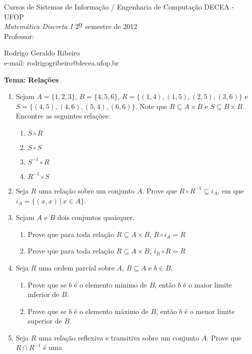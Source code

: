 \documentclass[11pt,a4paper]{report}
\begin{document}
 
\noindent Cursos de Sistemas de Informa\c{c}\~ao / Engenharia de Computa\c{c}\~ao
 \hfill DECEA - UFOP \\
{\it Matem\'atica Discreta I}
 \hfill $\mbox{2}^{\mbox{\underline{o}}}$ semestre de 2012 \\
Professor: \parbox[t]{14cm}{Rodrigo Geraldo Ribeiro \\
                     e-mail: rodrigogribeiro@decea.ufop.br}
 
 \hfill {\bf Tema: Rela\c{c}\~oes}
 
\vspace*{3mm}
\begin{enumerate}
	\item Sejam $A=\{1,2,3\}$, $B=\{4,5,6\}$, $R=\{(1,4), (1,5), (2,5), (3,6)\}$ e $S=\{(4,5), (4,6), (5,4), (6,6)\}$.
	      Note que $R\subseteq A\times B$ e $S\subseteq B\times B$. Encontre as seguintes rela\c{c}\~oes:
	\begin{enumerate}
		\item $S\circ R$
		\item $S\circ S$
		\item $S^{-1}\circ R$
		\item $R^{-1}\circ S$
	\end{enumerate}
	\item Seja $R$ uma rela\c{c}\~ao sobre um conjunto $A$. Prove que
          $R\circ R^{-1}\subseteq i_{A}$, em que $i_{A}=\{(x,x)\,|\,x\in A\}$.
	\item Sejam $A$ e $B$ dois conjuntos quaisquer.
	\begin{enumerate}
		\item Prove que para toda rela\c{c}\~ao $R\subseteq A\times B$, $R\circ i_{A} = R$
		\item Prove que para toda rela\c{c}\~ao $R\subseteq A\times B$, $i_{B}\circ R = R$
	\end{enumerate}
	\item Seja $R$ uma ordem parcial sobre $A$, $B\subseteq A$ e $b\in B$.
	\begin{enumerate}
		\item Prove que se $b$ \'e o elemento m\'inimo de $B$, ent\~ao $b$ \'e o maior limite inferior de $B$.
		\item Prove que se $b$ \'e o elemento m\'aximo de $B$, ent\~ao $b$ \'e o menor limite superior de $B$.
	\end{enumerate}
	\item Seja $R$ uma rela\c{c}\~ao reflexiva e transitiva sobre um conjunto $A$. Prove que $R\cap R^{-1}$ \'e uma 

\end{enumerate}
\end{document}
